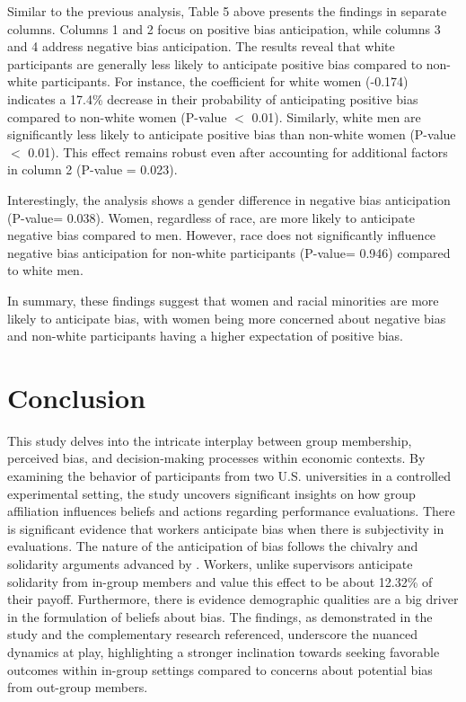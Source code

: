 Similar to the previous analysis, Table 5 above presents the findings in separate columns. Columns 1 and 2 focus on positive bias anticipation, while columns 3 and 4 address negative bias anticipation. The results reveal that white participants are generally less likely to anticipate positive bias compared to non-white participants. For instance, the coefficient for white women (-0.174) indicates a 17.4\% decrease in their probability of anticipating positive bias compared to non-white women (P-value $<$ 0.01). Similarly, white men are significantly less likely to anticipate positive bias than non-white women  (P-value $<$ 0.01). This effect remains robust even after accounting for additional factors in column 2 (P-value = 0.023). 

Interestingly, the analysis shows a gender difference in negative bias anticipation (P-value= 0.038). Women, regardless of race, are more likely to anticipate negative bias compared to men. However, race does not significantly influence negative bias anticipation for non-white participants (P-value= 0.946) compared to white men. 

In summary, these findings suggest that women and racial minorities are more likely to anticipate bias, with women being more concerned about negative bias and non-white participants having a higher expectation of positive bias.


\section{Conclusion} \label{sec:Conclusion}

This study delves into the intricate interplay between group membership, perceived bias, and decision-making processes within economic contexts. By examining the behavior of participants from two U.S. universities in a controlled experimental setting, the study uncovers significant insights on how group affiliation influences beliefs and actions regarding performance evaluations. There is significant evidence that workers anticipate bias when there is subjectivity in evaluations. The nature of the anticipation of bias follows the chivalry and solidarity arguments advanced by \cite{eckel2001chivalry}. Workers, unlike supervisors anticipate solidarity from in-group members and value this effect to be about 12.32\% of their payoff. Furthermore, there is evidence demographic qualities are a big driver in the formulation of beliefs about bias. The findings, as demonstrated in the study and the complementary research referenced, underscore the nuanced dynamics at play, highlighting a stronger inclination towards seeking favorable outcomes within in-group settings compared to concerns about potential bias from out-group members.


